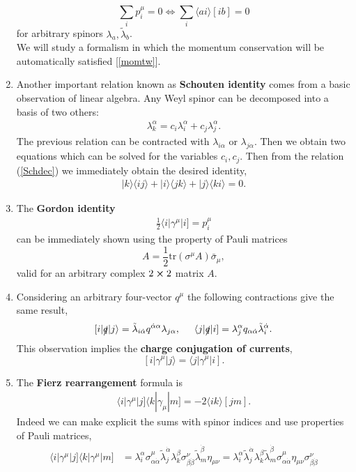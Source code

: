 \begin{enumerate}
	$$
		\sum_i p_i^\mu=0 \iff \sum_i \langle a i \rangle [ib]=0
	$$
	for arbitrary spinors $\lambda_a, \tilde\lambda_b$.\\
	We will study a formalism in which the momentum conservation will be automatically satisfied [\ref{momtw}]. 
	\item Another important relation known as \textbf{Schouten identity} comes from a basic observation of linear algebra. Any Weyl spinor can be decomposed into a basis of two others:
	\begin{align}
		\lambda_k^{\alpha}=c_i \lambda_i^\alpha+c_j \lambda_j^\alpha.	\label{Schdec}
	\end{align}
	The previous relation can be contracted with $\lambda_{i\alpha}$  or $\lambda_{j\alpha}$. Then we obtain two equations which can be solved for the variables $c_i,c_j$. Then from the relation (\ref{Schdec}) we immediately obtain the desired identity,
	\begin{align}
		|k\rangle\langle ij \rangle+|i\rangle \langle jk \rangle+|j\rangle \langle ki \rangle =0.	\label{schouten}
	\end{align}
	\item The \textbf{Gordon identity}
	\begin{align}
		\frac{1}{2}\langle i|\gamma^\mu|i]=p_i^\mu		\label{Gordon}
	\end{align}
	can be immediately shown using the property of Pauli matrices
	$$
		A=\frac{1}{2}\text{tr}\left(\sigma^\mu A\right)\bar{\sigma}_\mu,
	$$
	valid for an arbitrary complex $2\cross2$ matrix $A$.
	\item Considering an arbitrary four-vector $q^\mu$ the following contractions give the same result,
	$$
		[i|\slashed q |j \rangle=\tilde\lambda_{i\dot\alpha} q^{\dot\alpha \alpha} \lambda_{j\alpha}, \hspace{0.5cm} \langle j|\slashed q|i]=\lambda_{j}^\alpha q_{\alpha\dot\alpha} \tilde \lambda_{i}^{\dot\alpha}.
	$$
	This observation implies the \textbf{charge conjugation of currents},
	$$
		[i|\gamma^\mu|j\rangle=\langle j|\gamma^\mu|i].
	$$
	\item The \textbf{Fierz rearrangement} formula is
	\begin{align}
		\langle i |\gamma^\mu|j]\langle k|\gamma_\mu |m]=-2\langle ik \rangle[jm].
	\end{align}
	Indeed we can make explicit the sums with spinor indices and use properties of Pauli matrices,
	\begin{align*}
		\langle i |\gamma^\mu|j]\langle k|\gamma^\mu |m]&=\lambda_{i}^\alpha \sigma_{\alpha \dot \alpha}^{\mu}\tilde\lambda_{j}^{ \dot \alpha}\lambda_{k}^\beta \sigma^\nu_{\beta \dot \beta}\tilde\lambda_{m}^{ \dot \beta} \eta_{\mu\nu}=\lambda_{i}^\alpha \tilde\lambda_{j}^{ \dot \alpha}\lambda_{k}^\beta \tilde\lambda_{m}^{ \dot \beta} \sigma_{\alpha \dot \alpha}^{\mu}\eta_{\mu\nu} \sigma^\nu_{\beta \dot \beta}\\

\end{align*}
\end{enumerate}
